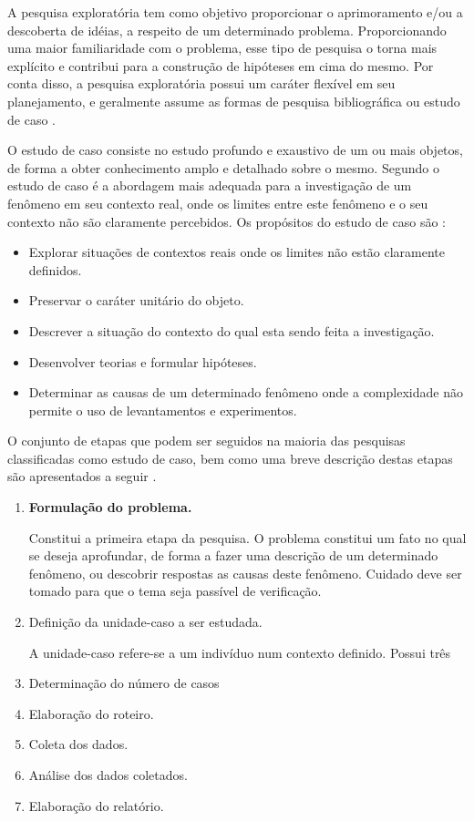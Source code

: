 A pesquisa exploratória tem como objetivo proporcionar o aprimoramento e/ou a descoberta de idéias, a respeito de um determinado problema. Proporcionando uma maior familiaridade com o problema, esse tipo de pesquisa o torna mais explícito e contribui para a construção de hipóteses em cima do mesmo. Por conta disso, a pesquisa exploratória possui um caráter flexível em seu planejamento, e geralmente assume as formas de pesquisa bibliográfica ou estudo de caso \cite{gil2002}.

O estudo de caso consiste no estudo profundo e exaustivo de um ou mais objetos, de forma a obter conhecimento amplo e detalhado sobre o mesmo. Segundo  o estudo de caso é a abordagem mais adequada para a investigação de um fenômeno em seu contexto real, onde os limites entre este fenômeno e o seu contexto não são claramente percebidos. Os propósitos do estudo de caso são \cite{gil2002}:

\begin{itemize}
\item Explorar situações de contextos reais onde os limites não estão claramente definidos.
\item Preservar o caráter unitário do objeto.
\item Descrever a situação do contexto do qual esta sendo feita a investigação.
\item Desenvolver teorias e formular hipóteses.
\item Determinar as causas de um determinado fenômeno onde a complexidade não permite o uso de levantamentos e experimentos.
\end{itemize}

O conjunto de etapas que podem ser seguidos na maioria das pesquisas classificadas como estudo de caso, bem como uma breve descrição destas etapas são apresentados a seguir \cite{gil2002}.

\begin{enumerate}
\item \textbf{Formulação do problema.}

Constitui a primeira etapa da pesquisa. O problema constitui um fato no qual se deseja aprofundar, de forma a fazer uma descrição de um determinado fenômeno, ou descobrir respostas as causas deste fenômeno. Cuidado deve ser tomado para que o tema seja passível de verificação.

\item Definição da unidade-caso a ser estudada.

A unidade-caso refere-se a um indivíduo num contexto definido. Possui três

\item Determinação do número de casos
\item Elaboração do roteiro.
\item Coleta dos dados.
\item Análise dos dados coletados.
\item Elaboração do relatório.
\end{enumerate}

